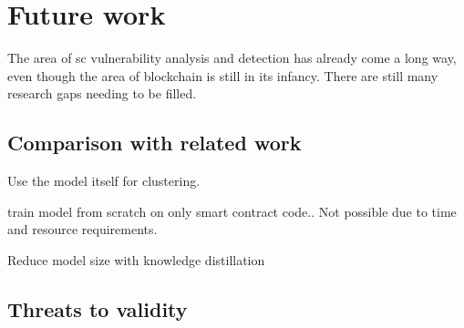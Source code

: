 \chapter{Future work}
\label{chap:future-work}

The area of \acrshort{sc} vulnerability analysis and detection has already come a long way, even though the area of blockchain is still in its infancy. There are still many research gaps needing to be filled.

\section{Comparison with related work}
\label{sec:comparison-with-related-work}


Use the model itself for clustering.

train model from scratch on only smart contract code.. Not possible  due to time and resource requirements.


Reduce model size with knowledge distillation

\section{Threats to validity}
\label{sec:threats-to-validity}